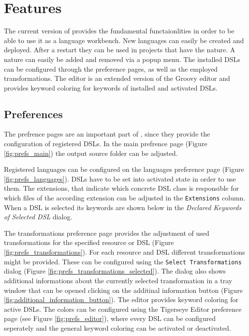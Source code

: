 \section{Features}

	The current version of \tiger provides the fundamental functaionlities in order to be able to use it as a language workbench. New languages can easily be created and deployed. After a restart they can be used in projects that have the \tiger nature. A \tiger nature can easily be added and removed via a popup menu. The installed DSLs can be configured through the preference pages, as well as the employed transformations. The \tiger editor is an extended version of the Groovy editor and provides keyword coloring for keywords of installed and activated DSLs.
	
	\subsection{Preferences}
	The prefrence pages are an important part of \tiger, since they provide the configuration of registered DSLs. In the main prefrence page (Figure \ref{fig:prefs_main}) the output source folder can be adjusted.
	
	Registered languages can be configured on the languages preference page (Figure \ref{fig:prefs_languages}). DSLs have to be set into activated state in order to use them.	
	The extensions, that indicate which concrete DSL class is responsible for which files of the according extension can be adjusted in the \texttt{Extensions} column. When a DSL is selected its keywords are shown below in the \textit{Declared Keywords of Selected DSL} dialog.
	
	The transformations preference page provides the adjustment of used transformations for the specified resource or DSL (Figure \ref{fig:prefs_transformations}). For each resource and DSL different transformations might be provided. These can be configured using the \texttt{Select Transformations} dialog (Figure \ref{fig:prefs_transformations_selected}). The dialog also shows additional informations about the currently selected transformation in a tray window that can be opened clicking on the additinal information button (Figure \ref{fig:additional_information_button}). The \tiger editor provides keyword coloring for active DSLs. The colors can be configured using the Tigerseye Editor preference page (see Figure \ref{fig:prefs_editor}), where every DSL can be configured seperately and the general keyword coloring can be activated or deactivated.
	
